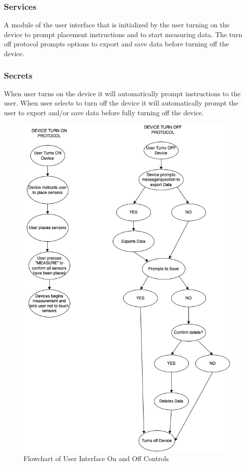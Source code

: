 \documentclass{article}
\begin{document}
\begin{description}
        \subsubsection{Services}
        A module of the user interface that is initialized by the user turning on the device to prompt placement instructions and to start measuring data.
        The turn off protocol prompts options to export and save data before turning off the device.
        \subsubsection{Secrets}
        When user turns on the device it will automatically prompt instructions to the user.
        When user selects to turn off the device it will automatically prompt the user to export and/or save data before fully turning off the device.
        \begin{figure}[!htb]
    	\centering
    	\includegraphics[width=0.65\linewidth]{flowchart-UI- ON_OFF.drawio.png}
    	\caption{Flowchart of User Interface On and Off Controls}
    \end{figure}
    \newpage

\end{description}
\end{document}
